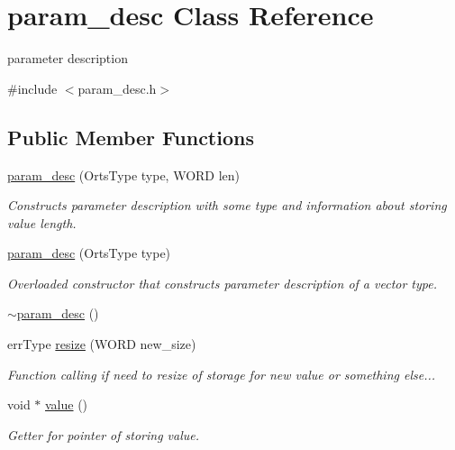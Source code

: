 \hypertarget{classparam__desc}{
\section{param\_\-desc Class Reference}
\label{d9/d42/classparam__desc}
}


parameter description  




{\ttfamily \#include $<$param\_\-desc.h$>$}

\subsection*{Public Member Functions}
\begin{DoxyCompactItemize}
\item 
\hyperlink{classparam__desc_ae7e25480d7b42b904f41885679b97b95}{param\_\-desc} (OrtsType type, WORD len)
\begin{DoxyCompactList}\small\item\em Constructs parameter description with some type and information about storing value length. \item\end{DoxyCompactList}\item 
\hyperlink{classparam__desc_a59e55e0bee9dbc667e424e712b948e83}{param\_\-desc} (OrtsType type)
\begin{DoxyCompactList}\small\item\em Overloaded constructor that constructs parameter description of a vector type. \item\end{DoxyCompactList}\item 
\hyperlink{classparam__desc_adfc419f326ca9c9f95f79ae9cf51e6c2}{$\sim$param\_\-desc} ()
\item 
errType \hyperlink{classparam__desc_a2e2b6320bf4a981c6749a3644cad08e1}{resize} (WORD new\_\-size)
\begin{DoxyCompactList}\small\item\em Function calling if need to resize of storage for new value or something else... \item\end{DoxyCompactList}\item 
void $\ast$ \hyperlink{classparam__desc_a82a598ad0f7c225e51c4b0312a0bc5a4}{value} ()
\begin{DoxyCompactList}\small\item\em Getter for pointer of storing value. \item\end{DoxyCompactList}\item 

\end{DoxyCompactItemize}
